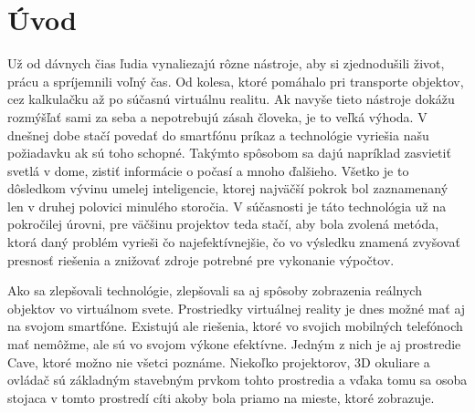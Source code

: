 \section*{Úvod}

Už od dávnych čias ľudia vynaliezajú rôzne nástroje, aby si zjednodušili život, prácu a spríjemnili voľný čas.
Od kolesa, ktoré pomáhalo pri transporte objektov, cez kalkulačku až po súčasnú virtuálnu realitu.
Ak navyše tieto nástroje dokážu rozmýšľať sami za seba a nepotrebujú zásah človeka, je to veľká výhoda.
V dnešnej dobe stačí povedať do smartfónu príkaz a technológie vyriešia našu požiadavku ak sú toho schopné.
Takýmto spôsobom sa dajú napríklad zasvietiť svetlá v dome, zistiť informácie o počasí a mnoho ďalšieho.
Všetko je to dôsledkom vývinu umelej inteligencie, ktorej najväčší pokrok bol zaznamenaný len v druhej polovici
minulého storočia.
V súčasnosti je táto technológia už na pokročilej úrovni, pre väčšinu projektov teda stačí, aby bola zvolená metóda,
ktorá daný problém vyrieši čo najefektívnejšie, čo vo výsledku znamená zvyšovať presnosť riešenia a znižovať zdroje
potrebné pre vykonanie výpočtov.

Ako sa zlepšovali technológie, zlepšovali sa aj spôsoby zobrazenia reálnych objektov vo virtuálnom svete.
Prostriedky virtuálnej reality je dnes možné mať aj na svojom smartfóne.
Existujú ale riešenia, ktoré vo svojich mobilných telefónoch mať nemôžme, ale sú vo svojom výkone efektívne.
Jedným z nich je aj prostredie Cave, ktoré možno nie všetci poznáme.
Niekoľko projektorov, 3D okuliare a ovládač sú základným stavebným prvkom tohto prostredia a vďaka tomu sa osoba
stojaca v tomto prostredí cíti akoby bola priamo na mieste, ktoré zobrazuje.
